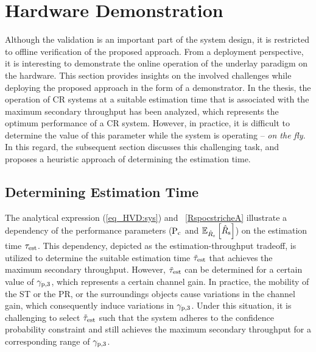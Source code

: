 \section{Hardware Demonstration}
\label{sec:demo}
Although the validation is an important part of the system design, it is restricted to offline verification of the proposed approach. From a deployment perspective, it is interesting to demonstrate the online operation of the underlay paradigm on the hardware. This section provides insights on the involved challenges while deploying the proposed approach in the form of a demonstrator. In the thesis, the operation of CR systems at a suitable estimation time that is associated with the maximum secondary throughput has been analyzed, which represents the optimum performance of a CR system. However, in practice, it is difficult to determine the value of this parameter while the system is operating -- \textit{on the fly}. In this regard, the subsequent section discusses this challenging task, and proposes a heuristic approach of determining the estimation time. 

\subsection{Determining Estimation Time}
\label{esttime}
The analytical expression (\ref{eq_HVD:sys}) and \figurename~\ref{RspocstricheA} illustrate a dependency of the performance parameters ($\text{P}_{\text{c}}$ and ${\mathbb E}_{\hat{{{R}}}_{\text{s}}}\left[ \hat{{{R}}}_{\text{s}} \right]$) on the estimation time $\tau_{\text{est}}$. This dependency, depicted as the estimation-throughput tradeoff, is utilized to determine the suitable estimation time $\tilde{\tau}_{\text{est}}$ that achieves the maximum secondary throughput. However, $\tilde{\tau}_{\text{est}}$ can be determined for a certain value of ${\gamma}_{\text{p,3}}$, which represents a certain channel gain. In practice, the mobility of the ST or the PR, or the surroundings objects cause variations in the channel gain, which consequently induce variations in ${\gamma}_{\text{p,3}}$. Under this situation, it is challenging to select $\tilde{\tau}_{\text{est}}$ such that the system adheres to the confidence probability constraint and still achieves the maximum secondary throughput for a corresponding range of ${\gamma}_{\text{p,3}}$. 

